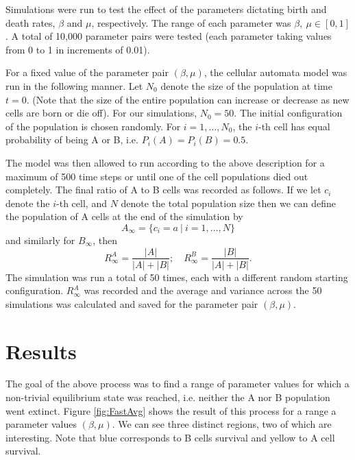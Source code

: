 \documentclass[12pt,letterpaper,cm]{article}
\renewcommand{\.}{\cdot}
\newcommand{\<}{\langle}
\renewcommand{\>}{\rangle}
\begin{document}
	Simulations were run to test the effect of the parameters dictating birth and death rates, $\beta$ and $\mu$, respectively. The range of each parameter was $\beta,\ \mu \in [0,1]$. A total of 10,000 parameter pairs were tested (each parameter taking values from 0 to 1 in increments of 0.01). 
	
	For a fixed value of the parameter pair $(\beta,\mu)$, the cellular automata model was run in the following manner. Let $N_0$ denote the size of the population at time $t=0$. (Note that the size of the entire population can increase or decrease as new cells are born or die off). For our simulations, $N_0 = 50$. The initial configuration of the population is chosen randomly. For $i = 1,...,N_0$, the $i$-th cell has equal probability of being A or B, i.e. $P_i(A) = P_i(B) = 0.5$.
	
	The model was then allowed to run according to the above description for a maximum of 500 time steps or until one of the cell populations died out completely. The final ratio of A to B cells was recorded as follows. If we let $c_i$ denote the $i$-th cell, and $N$ denote the total population size then we can define the population of A cells at the end of the simulation by
	\[A_\infty = \{c_i = a\ |\ i=1,...,N \} \]
	and similarly for $B_\infty$, then 
	\[R_\infty^A = \dfrac{|A|}{|A| + |B|}; \quad R_\infty^B = \dfrac{|B|}{|A| + |B|}. \]
	The simulation was run a total of 50 times, each with a different random starting configuration. $R_\infty^A$ was recorded and the average and variance across the 50 simulations was calculated and saved for the parameter pair $(\beta, \mu)$.
	
		
	\section*{Results}
	
	The goal of the above process was to find a range of parameter values for which a non-trivial equilibrium state was reached, i.e. neither the A nor B population went extinct. Figure \ref{fig:FastAvg} shows the result of this process for a range a parameter values $(\beta, \mu)$. We can see three distinct regions, two of which are interesting. Note that blue corresponds to B cells survival and yellow to A cell survival. 
	
\end{document}
